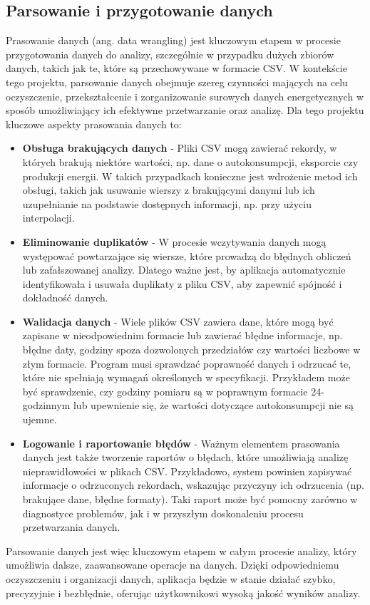 \subsection{Parsowanie i przygotowanie danych}
Prasowanie danych (ang. data wrangling) jest kluczowym etapem w procesie przygotowania danych do analizy, szczególnie w przypadku dużych zbiorów danych, takich jak te, które są przechowywane w formacie CSV. W kontekście tego projektu, parsowanie danych obejmuje szereg czynności mających na celu oczyszczenie, przekształcenie i zorganizowanie surowych danych energetycznych w sposób umożliwiający ich efektywne przetwarzanie oraz analizę. Dla tego projektu kluczowe aspekty prasowania danych to:
\begin{itemize}
    \item \textbf{Obsługa brakujących danych} - Pliki CSV mogą zawierać rekordy, w których brakują niektóre wartości, np. dane o autokonsumpcji, eksporcie czy produkcji energii. W takich przypadkach konieczne jest wdrożenie metod ich obsługi, takich jak usuwanie wierszy z brakującymi danymi lub ich uzupełnianie na podstawie dostępnych informacji, np. przy użyciu interpolacji.
    \item \textbf{Eliminowanie duplikatów} - W procesie wczytywania danych mogą występować powtarzające się wiersze, które prowadzą do błędnych obliczeń lub zafałszowanej analizy. Dlatego ważne jest, by aplikacja automatycznie identyfikowała i usuwała duplikaty z pliku CSV, aby zapewnić spójność i dokładność danych.
    \newpage
    \item \textbf{Walidacja danych} - Wiele plików CSV zawiera dane, które mogą być zapisane w nieodpowiednim formacie lub zawierać błędne informacje, np. błędne daty, godziny spoza dozwolonych przedziałów czy wartości liczbowe w złym formacie. Program musi sprawdzać poprawność danych i odrzucać te, które nie spełniają wymagań określonych w specyfikacji. Przykładem może być sprawdzenie, czy godziny pomiaru są w poprawnym formacie 24-godzinnym lub upewnienie się, że wartości dotyczące autokonsumpcji nie są ujemne.
    \item \textbf{Logowanie i raportowanie błędów} - Ważnym elementem prasowania danych jest także tworzenie raportów o błędach, które umożliwiają analizę nieprawidłowości w plikach CSV. Przykładowo, system powinien zapisywać informacje o odrzuconych rekordach, wskazując przyczyny ich odrzucenia (np. brakujące dane, błędne formaty). Taki raport może być pomocny zarówno w diagnostyce problemów, jak i w przyszłym doskonaleniu procesu przetwarzania danych.
\end{itemize}
Parsowanie danych jest więc kluczowym etapem w całym procesie analizy, który umożliwia dalsze, zaawansowane operacje na danych. Dzięki odpowiedniemu oczyszczeniu i organizacji danych, aplikacja będzie w stanie działać szybko, precyzyjnie i bezbłędnie, oferując użytkownikowi wysoką jakość wyników analizy.
